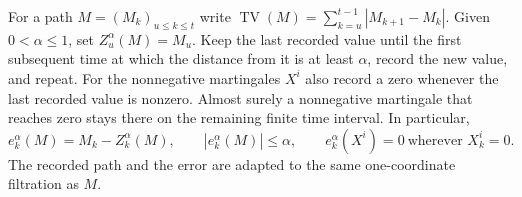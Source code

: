 \documentclass[11pt]{article}
\begin{document}
For a path \(M=(M_k)_{u\le k\le t}\) write
\(\operatorname{TV}(M)=\sum_{k=u}^{t-1}|M_{k+1}-M_k|\).
Given \(0<\alpha\le1\), set \(Z^\alpha_u(M)=M_u\).
Keep the last recorded value until the first subsequent time at which
the distance from it is at least \(\alpha\), record the new value, and
repeat. For the nonnegative martingales \(X^i\) also record a zero
whenever the last recorded value is nonzero. Almost surely a
nonnegative martingale that reaches zero stays there on the remaining
finite time interval. In particular,
\begin{equation}\label{eq:stop-tracking}
 e^\alpha_k(M)=M_k-Z^\alpha_k(M),\qquad
 |e^\alpha_k(M)|\le\alpha,\qquad
 e^\alpha_k(X^i)=0\ \text{wherever }X^i_k=0 .
\end{equation}
The recorded path and the error are adapted to the same one-coordinate
filtration as \(M\).
\end{document}
